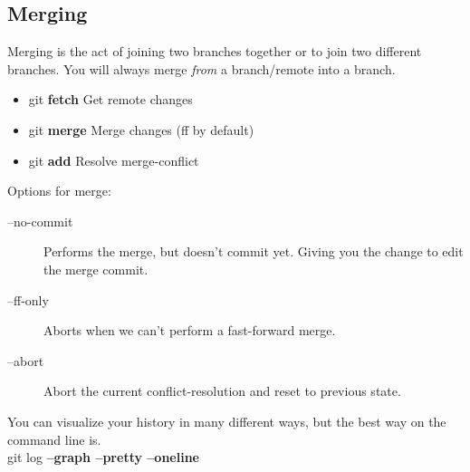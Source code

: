 \documentclass{beamer}
\begin{document}
\subsection{Merging}
\begin{frame}[fragile]
Merging is the act of joining two branches together or to join two different branches. You will always merge \emph{from} a branch/remote into a branch.
  \begin{block}{}
    \begin{itemize}
      \item git \textbf{fetch}  Get remote changes
      \item git \textbf{merge}  Merge changes (ff by default)
      \item git \textbf{add}    Resolve merge-conflict
    \end{itemize}

    Options for merge:
    \begin{description}
      \item[--no-commit] Performs the merge, but doesn't commit yet. Giving you the change to edit the merge commit.
      \item[--ff-only]   Aborts when we can't perform a fast-forward merge.
      \item[--abort]     Abort the current conflict-resolution and reset to previous state.
    \end{description}
  \end{block}

  You can visualize your history in many different ways, but the best way on the command line is.\\
  git log \textbf{--graph --pretty --oneline}
\end{frame}
\end{document}

